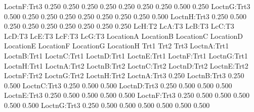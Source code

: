 \documentclass[12pt]{article}
\begin{document}
\begin{Schunk}
\begin{Soutput}
LoctnF:Trt3  0.250  0.250  0.250  0.250  0.250  0.250  0.250  0.500  0.250
LoctnG:Trt3  0.500  0.250  0.250  0.250  0.250  0.250  0.250  0.250  0.500
LoctnH:Trt3  0.250  0.500  0.250  0.250  0.250  0.250  0.250  0.250  0.250
            LcH:T2 LcA:T3 LcB:T3 LcC:T3 LcD:T3 LcE:T3 LcF:T3 LcG:T3
LocationA                                                          
LocationB                                                          
LocationC                                                          
LocationD                                                          
LocationE                                                          
LocationF                                                          
LocationG                                                          
LocationH                                                          
Trt1                                                               
Trt2                                                               
Trt3                                                               
LoctnA:Trt1                                                        
LoctnB:Trt1                                                        
LoctnC:Trt1                                                        
LoctnD:Trt1                                                        
LoctnE:Trt1                                                        
LoctnF:Trt1                                                        
LoctnG:Trt1                                                        
LoctnH:Trt1                                                        
LoctnA:Trt2                                                        
LoctnB:Trt2                                                        
LoctnC:Trt2                                                        
LoctnD:Trt2                                                        
LoctnE:Trt2                                                        
LoctnF:Trt2                                                        
LoctnG:Trt2                                                        
LoctnH:Trt2                                                        
LoctnA:Trt3  0.250                                                 
LoctnB:Trt3  0.250  0.500                                          
LoctnC:Trt3  0.250  0.500  0.500                                   
LoctnD:Trt3  0.250  0.500  0.500  0.500                            
LoctnE:Trt3  0.250  0.500  0.500  0.500  0.500                     
LoctnF:Trt3  0.250  0.500  0.500  0.500  0.500  0.500              
LoctnG:Trt3  0.250  0.500  0.500  0.500  0.500  0.500  0.500       

\end{Soutput}
\end{Schunk}
\end{document}

